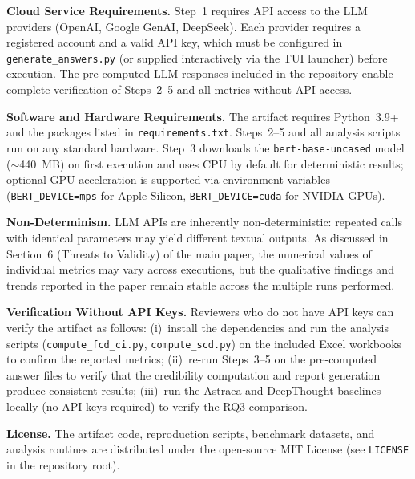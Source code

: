 \smallskip\noindent\textbf{Cloud Service Requirements.} Step~1 requires API access to the LLM providers (OpenAI, Google GenAI, DeepSeek). Each provider requires a registered account and a valid API key, which must be configured in \texttt{generate\_answers.py} (or supplied interactively via the TUI launcher) before execution. The pre-computed LLM responses included in the repository enable complete verification of Steps~2--5 and all metrics without API access.

\noindent\textbf{Software and Hardware Requirements.} The artifact requires Python~3.9+ and the packages listed in \texttt{requirements.txt}. Steps~2--5 and all analysis scripts run on any standard hardware. Step~3 downloads the \texttt{bert-base-uncased} model (${\sim}$440~MB) on first execution and uses CPU by default for deterministic results; optional GPU acceleration is supported via environment variables (\texttt{BERT\_DEVICE=mps} for Apple Silicon, \texttt{BERT\_DEVICE=cuda} for NVIDIA GPUs).

\smallskip\noindent\textbf{Non-Determinism.} LLM APIs are inherently non-deterministic: repeated calls with identical parameters may yield different textual outputs. As discussed in Section~6 (Threats to Validity) of the main paper, the numerical values of individual metrics may vary across executions, but the qualitative findings and trends reported in the paper remain stable across the multiple runs performed.

\smallskip\noindent\textbf{Verification Without API Keys.} Reviewers who do not have API keys can verify the artifact as follows: (i)~install the dependencies and run the analysis scripts (\texttt{compute\_fcd\_ci.py}, \texttt{compute\_scd.py}) on the included Excel workbooks to confirm the reported metrics; (ii)~re-run Steps~3--5 on the pre-computed answer files to verify that the credibility computation and report generation produce consistent results; (iii)~run the Astraea and DeepThought baselines locally (no API keys required) to verify the RQ3 comparison.

\smallskip\noindent\textbf{License.} The artifact code, reproduction scripts, benchmark datasets, and analysis routines are distributed under the open-source MIT License (see \texttt{LICENSE} in the repository root).

